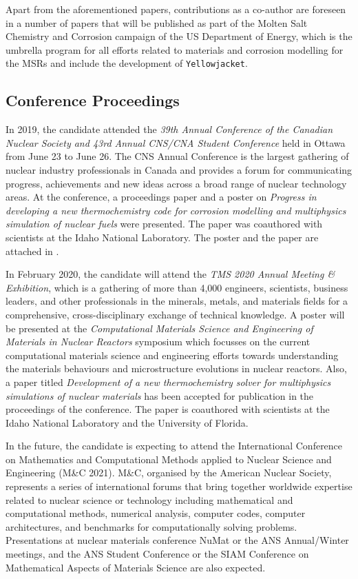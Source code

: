 	Apart from the aforementioned papers, contributions as a co-author are foreseen in a number of papers that will be published as part of the Molten Salt Chemistry and Corrosion campaign of the US Department of Energy, which is the umbrella program for all efforts related to materials and corrosion  modelling for the MSRs and include the development of \texttt{Yellowjacket}.
	
	\subsection{Conference Proceedings}
	In 2019, the candidate attended the \emph{39th Annual Conference of the Canadian Nuclear Society and 43rd Annual CNS/CNA Student Conference} held in Ottawa from June 23 to June 26. The CNS Annual Conference is the largest gathering of nuclear industry professionals in Canada and provides a forum for communicating progress, achievements and new ideas across a broad range of nuclear technology areas. At the conference, a proceedings paper and a poster on \emph{Progress in developing a new thermochemistry code for corrosion modelling and multiphysics simulation of nuclear fuels} were presented. The paper was coauthored with scientists at the Idaho National Laboratory. The poster and the paper are attached in .
	
	In February 2020, the candidate will attend the \emph{TMS 2020 Annual Meeting \& Exhibition}, which is a gathering of more than 4,000 engineers, scientists, business leaders, and other professionals in the minerals, metals, and materials fields for a comprehensive, cross-disciplinary exchange of technical knowledge. A poster will be presented at the \emph{Computational Materials Science and Engineering of Materials in Nuclear Reactors} symposium which focusses on the current computational materials science and engineering efforts towards understanding the materials behaviours and microstructure evolutions in nuclear reactors. Also, a paper titled \emph{Development of a new thermochemistry solver for multiphysics simulations of nuclear materials} has been accepted for publication in the proceedings of the conference. The paper is coauthored with scientists at the Idaho National Laboratory and the University of Florida.

	
	In the future, the candidate is expecting to attend the International Conference on Mathematics and Computational Methods applied to Nuclear Science and Engineering (M\&C 2021). M\&C, organised by the American Nuclear Society, represents a series of international forums that bring together worldwide expertise related to nuclear science or technology including mathematical and computational methods, numerical analysis, computer codes, computer architectures, and benchmarks for computationally solving problems. Presentations at nuclear materials conference NuMat or the ANS Annual/Winter meetings, and the ANS Student Conference or the SIAM Conference on Mathematical Aspects of Materials Science are also expected.
	
